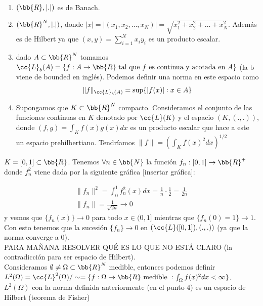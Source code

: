 \begin{ejemplo}\ \\
    \begin{enumerate}
        \item $(\bb{R}, |.|)$ es de Banach.
        \item $(\bb{R}^N, |.|)$, donde $|x| = |(x_1, x_2, \dots, x_N)| = \sqrt{x_1^2 + x_2^2 + \dots + x_N^2}$. Además es de Hilbert ya que $(x,y) = \sum_{i=1}^N x_i y_i$ es un producto escalar.
        \item  dado $A\subset \bb{R}^N$ tomamos $\cc{L}_b(A) = \{f: A \to \bb{R} \text{ tal que } f \text{ es continua y acotada en } A \}$ (la b viene de bounded en inglés). Podemos definir una norma en este espacio como 
        \begin{align*}
            \|f\|_{\cc{L}_b(A)} = \sup\{|f(x)| : x\in A\}
        \end{align*}

        \item Supongamos que $K\subset \bb{R}^N$ compacto. Consideramos el conjunto de las funciones continuas en $K$ denotado por $\cc{L}(K)$ y el espacio $(K, (.,.))$, donde $(f,g) = \int_K f(x)g(x) dx$ es un producto escalar que hace a este un espacio prehilbertiano. Tendríamos $\|f\| = \left(\displaystyle\int_K f(x)^2 dx\right)^{1/2}$
    \end{enumerate}
\end{ejemplo}

\begin{ejemplo}


    $K = [0,1]\subset \bb{R}$. Tenemos $\forall n \in \bb{N}$ la función  $f_n : [0,1] \to \bb{R}^+$ donde $f_n^2$ viene dada por la siguiente gráfica [insertar gráfica]:


    \begin{align*}
        \|f_n\|^2 = \int_0^1 f_n^2(x) dx = \frac{1}{n} \cdot \frac{1}{2} = \frac{1}{2n}\\
        \|f_n\| = \frac{1}{\sqrt{2n}} \to 0
    \end{align*}
    y vemos que $\{f_n(x)\} \to 0$ para todo $x\in (0,1]$ mientras que $\{f_n(0) = 1\} \to 1$.\\

    Con esto tenemos que la sucesión $\{f_n\} \to 0$ en $(\cc{L}([0,1]), (.,.))$ (ya que la norma converge a 0).\\

    PARA MAÑANA RESOLVER QUÉ ES LO QUE NO ESTÁ CLARO (la contradicción para ser espacio de Hilbert).\\

    Consideramos $\emptyset \neq \Omega \subset \bb{R}^N$ medible, entonces podemos definir $L^2(\Omega) = \cc{L}^2(\Omega)/\sim = \{f:\Omega \to \bb{R} \text{ medible } : \int_\Omega f(x)^2 dx < \infty\}$. $L^2(\Omega)$ con la norma definida anteriormente (en el punto 4) es un espacio de Hilbert (teorema de Fisher)
\end{ejemplo}

